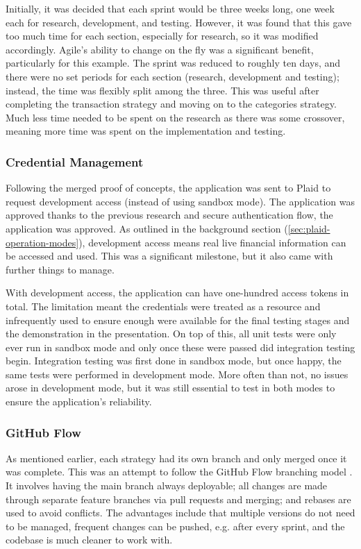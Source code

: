Initially, it was decided that each sprint would be three weeks long, one week each for research, development, and testing. However, it was found that this gave too much time for each section, especially for research, so it was modified accordingly. Agile's ability to change on the fly was a significant benefit, particularly for this example. The sprint was reduced to roughly ten days, and there were no set periods for each section (research, development and testing); instead, the time was flexibly split among the three. This was useful after completing the transaction strategy and moving on to the categories strategy. Much less time needed to be spent on the research as there was some crossover, meaning more time was spent on the implementation and testing.

\subsubsection{Credential Management}
Following the merged proof of concepts, the application was sent to Plaid to request development access (instead of using sandbox mode). The application was approved thanks to the previous research and secure authentication flow, the application was approved. As outlined in the background section (\ref{sec:plaid-operation-modes}), development access means real live financial information can be accessed and used. This was a significant milestone, but it also came with further things to manage.

With development access, the application can have one-hundred access tokens in total. The limitation meant the credentials were treated as a resource and infrequently used to ensure enough were available for the final testing stages and the demonstration in the presentation. On top of this, all unit tests were only ever run in sandbox mode and only once these were passed did integration testing begin. Integration testing was first done in sandbox mode, but once happy, the same tests were performed in development mode. More often than not, no issues arose in development mode, but it was still essential to test in both modes to ensure the application's reliability.


\subsubsection{GitHub Flow}
\label{sec:github-flow}
As mentioned earlier, each strategy had its own branch and only merged once it was complete. This was an attempt to follow the GitHub Flow branching model \cite{GitHubFlow}. It involves having the main branch always deployable; all changes are made through separate feature branches via pull requests and merging; and rebases are used to avoid conflicts. The advantages include that multiple versions do not need to be managed, frequent changes can be pushed, e.g. after every sprint, and the codebase is much cleaner to work with.

